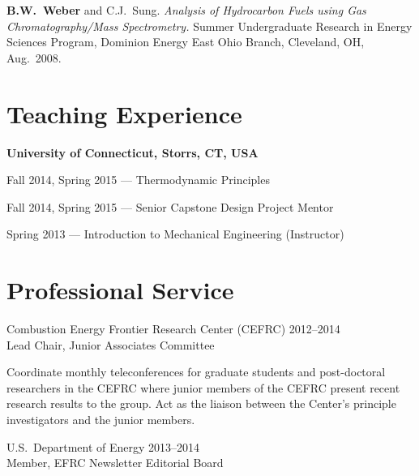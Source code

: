\begin{bibmune}
\item \textbf{ B.W.\ Weber} and C.J.\ Sung. \textit{Analysis of
        Hydrocarbon Fuels using Gas Chromatography/Mass Spectrometry.}
        Summer Undergraduate Research in Energy Sciences Program,
        Dominion Energy East Ohio Branch, Cleveland, OH, Aug.\ 2008.
\end{bibmune}

\vspace{0.1in}

\section{{\sectionfont Teaching Experience}}

\textbf{University of Connecticut, Storrs, CT, USA}

\vspace{\baselineskip}
Fall 2014, Spring 2015 --- Thermodynamic Principles

Fall 2014, Spring 2015 --- Senior Capstone Design Project Mentor

Spring 2013 --- Introduction to Mechanical Engineering (Instructor)

\section{{\sectionfont Professional Service}}

Combustion Energy Frontier Research Center (CEFRC) \hfill 2012--2014\\
Lead Chair, Junior Associates Committee

\begin{innerlist}
\item[] Coordinate monthly teleconferences for graduate students
and post-doctoral researchers in the CEFRC where junior members of
the CEFRC present recent research results to the group.
Act as the liaison between the Center's principle investigators
and the junior members.
\end{innerlist}

\vspace{\baselineskip}

U.S.\ Department of Energy \hfill 2013--2014\\
Member, EFRC Newsletter Editorial Board


